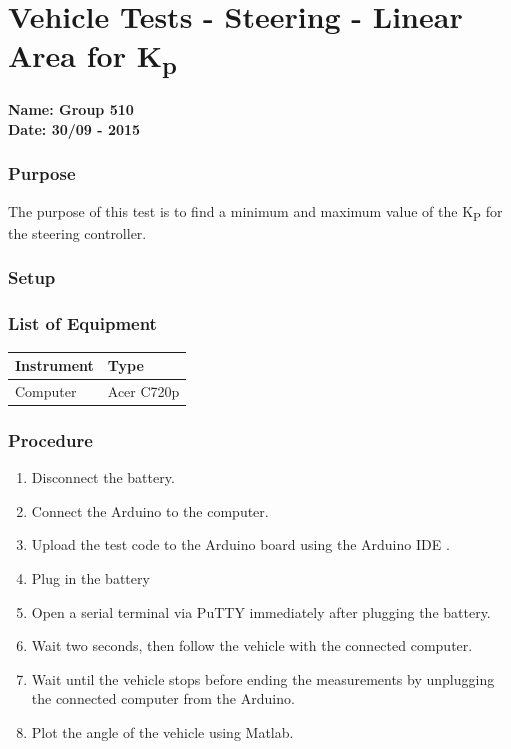 \pagebreak
\section{Vehicle Tests - Steering - Linear Area for \si{K_p}} \label{app:LinearAreaKp}
\textbf{Name: Group 510}\\
\textbf{Date: 30/09 - 2015}

\subsubsection{Purpose}
The purpose of this test is to find a minimum and maximum value of the \si{K_P} for the steering controller.

\subsubsection{Setup}


\subsubsection{List of Equipment}

\begin{table}[H]
\begin{tabular}{|p{10cm}|p{4cm}|}
\hline%
  \textbf{Instrument}                     &  \textbf{Type}       \\
\hline%
  Computer                                &  Acer C720p    \\
\hline %
\end{tabular}
\end{table}

\subsubsection{Procedure}

\begin{enumerate}
  \item Disconnect the battery.
  \item Connect the Arduino to the computer.
  \item Upload the test code to the Arduino board using the Arduino IDE  \cite{ArduinoIDE}.
  \item Plug in the battery
  \item Open a serial terminal via PuTTY \cite{PuTTY} immediately after plugging the battery.
  \item Wait two seconds, then follow the vehicle with the connected computer.
  \item Wait until the vehicle stops before ending the measurements by unplugging the connected computer from the Arduino.
  \item Plot the angle of the vehicle using Matlab.
\end{enumerate}

